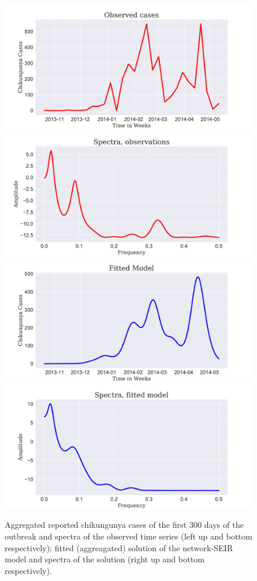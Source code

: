 \documentclass[11pt]{article}
\begin{document}

\begin{figure}[ht]
\centering
\includegraphics[scale=.24]{./observed_cases_st}
\includegraphics[scale=.24]{./spectra_obs}
\includegraphics[scale=.24]{./fitted_model_st}
\includegraphics[scale=.24]{./spectra_sim}\\
\caption{\small Aggregated reported chikungunya cases of the first 300 days of the outbreak and spectra of the observed time series (left up and bottom respectively); fitted (aggreagated) solution of the network-SEIR model and spectra of the solution (right up and bottom respectively).}
\label{fig:data-model-spectra}
\end{figure}
\end{document}
